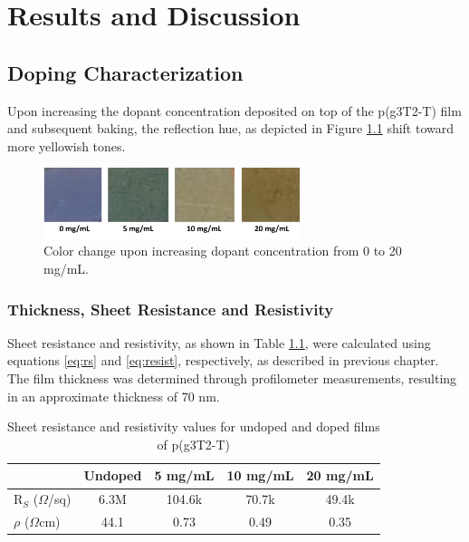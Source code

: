 \chapter{Results and Discussion} \label{cha:3}

\section{Doping Characterization}

Upon increasing the dopant concentration deposited on top of the p(g3T2-T) film and subsequent baking, the reflection hue, as depicted in Figure \ref{fig:color} shift toward more yellowish tones.

\begin{figure}[ht]
  \centering
  \includegraphics[width=7.5cm]{Images/pdf/doping_color.pdf}
  \caption[Color shift upon doping level increase]{Color change upon increasing dopant concentration from 0 to 20 mg/mL.
  \label{fig:color}}
\end{figure}

\subsection{Thickness, Sheet Resistance and Resistivity}

Sheet resistance and resistivity, as shown in Table \ref{tab:res}, were calculated using equations \ref{eq:rs} and \ref{eq:resist}, respectively, as described in previous chapter. The film thickness was determined through profilometer measurements, resulting in an approximate thickness of 70 nm.

\begin{table}[ht]
\centering
\caption{Sheet resistance and resistivity values for undoped and doped films of p(g3T2-T)}
\begin{tabular}{l|c|c|c|c}
& Undoped & 5 mg/mL & 10 mg/mL & 20 mg/mL \\\hline
R$_{S}$ ($\Omega$/sq) & 6.3M & 104.6k & 70.7k & 49.4k\\
$\rho$ ($\Omega$cm) & 44.1 & 0.73 & 0.49 & 0.35\\\hline
\end{tabular}
\label{tab:res}
\end{table}


